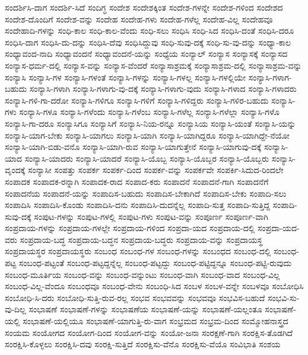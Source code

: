 {ಸಂದರ್ಶಿಸಿ-ದಾಗ
ಸಂದರ್ಶಿ-ಸಿದೆ
ಸಂದಿಗ್ಧ
ಸಂದೇಶ
ಸಂದೇಶಕ್ಕಿಂತ
ಸಂದೇಶ-ಗಳನ್ನೇ
ಸಂದೇಶ-ಗಳಿಂದ
ಸಂದೇಶದ
ಸಂದೇಶ-ದೊಂದಿಗೆ
ಸಂದೇಶ-ವನ್ನು
ಸಂದೇಹ
ಸಂದೇಹ-ಗಳು
ಸಂದೇಹ-ಗಳೆಲ್ಲ
ಸಂದೇಹ-ವಿಲ್ಲ
ಸಂದೇಹವೂ
ಸಂದೇಹಾದಿ-ಗಳನ್ನು
ಸಂಧಿ-ಕಾಲ
ಸಂಧಿ-ಕಾಲ-ವೆಂದು
ಸಂಧಿ-ಸಲು
ಸಂಧಿಸಿ
ಸಂಧಿ-ಸಿದ
ಸಂಧಿಸಿ-ದಂತೆ
ಸಂಧಿಸಿ-ದರೂ
ಸಂಧಿಸಿ-ದಾಗ
ಸಂಧಿಸಿ-ದು-ದನ್ನು
ಸಂಧಿಸಿ-ದೆವು
ಸಂಧಿಸಿದ್ದುವು
ಸಂಧಿ-ಸುವು-ದಕ್ಕೆ
ಸಂಧಿ-ಸು-ವು-ದನ್ನು
ಸಂಧ್ಯಾ-ಕಾಲ
ಸಂಧ್ಯಾವಂದ-ನಾದಿ
ಸಂಧ್ಯಾವಂದನೆ
ಸಂಧ್ಯಾವಂದನೆ-ಯನ್ನು
ಸಂಧ್ಯೆಯ
ಸಂನ್ಯಾಲ್
ಸಂನ್ಯಾಸ
ಸಂನ್ಯಾಸಕ್ಕೆ
ಸಂನ್ಯಾಸದ
ಸಂನ್ಯಾಸ-ಧರ್ಮ-ದಲ್ಲಿ
ಸಂನ್ಯಾಸ-ವನ್ನು
ಸಂನ್ಯಾಸ-ವೆಂದರೆ
ಸಂನ್ಯಾಸಾಶ್ರಮಕ್ಕೆ
ಸಂನ್ಯಾಸಾಶ್ರಮ-ದಲ್ಲಿ
ಸಂನ್ಯಾಸಾಶ್ರಮ-ವನ್ನು
ಸಂನ್ಯಾಸಿ
ಸಂನ್ಯಾಸಿ-ಗಳ
ಸಂನ್ಯಾಸಿ-ಗಳಂತೆ
ಸಂನ್ಯಾಸಿ-ಗಳನ್ನು
ಸಂನ್ಯಾಸಿ-ಗಳಲ್ಲ
ಸಂನ್ಯಾಸಿ-ಗಳಲ್ಲಿಯೇ
ಸಂನ್ಯಾಸಿ-ಗಳಾಗ-ಬಹುದು
ಸಂನ್ಯಾಸಿ-ಗಳಾಗಿ
ಸಂನ್ಯಾಸಿ-ಗಳಾಗು-ವು-ದಕ್ಕೆ
ಸಂನ್ಯಾಸಿ-ಗಳಾಗು-ವುದು
ಸಂನ್ಯಾಸಿ-ಗಳಾದ
ಸಂನ್ಯಾಸಿ-ಗಳಾದರು
ಸಂನ್ಯಾಸಿ-ಗಳಿ-ಗಾ-ದರೋ
ಸಂನ್ಯಾಸಿ-ಗಳಿಗೂ
ಸಂನ್ಯಾಸಿ-ಗಳಿಗೆ
ಸಂನ್ಯಾಸಿ-ಗಳಿದ್ದರು
ಸಂನ್ಯಾಸಿ-ಗಳಿರ-ಬಹುದು
ಸಂನ್ಯಾಸಿ-ಗಳು
ಸಂನ್ಯಾಸಿ-ಗಳೂ
ಸಂನ್ಯಾಸಿ-ಗಳೆಂದು
ಸಂನ್ಯಾಸಿ-ಗಳೆಂಬ
ಸಂನ್ಯಾಸಿ-ಗಳೆಲ್ಲ
ಸಂನ್ಯಾಸಿ-ಗಳೆಲ್ಲಾ
ಸಂನ್ಯಾಸಿ-ಗಳೊ
ಸಂನ್ಯಾಸಿ-ಗಾ-ದರೂ
ಸಂನ್ಯಾಸಿಗೂ
ಸಂನ್ಯಾಸಿಗೆ
ಸಂನ್ಯಾಸಿ-ನಿಯ-ರನ್ನೂ
ಸಂನ್ಯಾಸಿಯ
ಸಂನ್ಯಾಸಿ-ಯಂತೆ
ಸಂನ್ಯಾಸಿ-ಯನ್ನು
ಸಂನ್ಯಾಸಿ-ಯಾಗ-ಬೇಕು
ಸಂನ್ಯಾಸಿ-ಯಾಗಲು
ಸಂನ್ಯಾಸಿ-ಯಾಗಿ
ಸಂನ್ಯಾಸಿ-ಯಾಗಿದ್ದರೂ
ಸಂನ್ಯಾಸಿ-ಯಾಗಿದ್ದೇ-ನೆಯೋ
ಸಂನ್ಯಾಸಿ-ಯಾಗಿ-ಬಿಡು-ವನೊ
ಸಂನ್ಯಾಸಿ-ಯಾಗಿ-ರುವ
ಸಂನ್ಯಾಸಿ-ಯಾಗುತ್ತೇನೆ
ಸಂನ್ಯಾಸಿ-ಯಾಗುವು-ದಕ್ಕೆ
ಸಂನ್ಯಾಸಿ-ಯಾದ
ಸಂನ್ಯಾಸಿ-ಯಾದರು
ಸಂನ್ಯಾಸಿ-ಯಾದರೆ
ಸಂನ್ಯಾಸಿ-ಯೊಬ್ಬ
ಸಂನ್ಯಾಸಿ-ಯೊಬ್ಬರ
ಸಂನ್ಯಾಸಿ-ಯೊಬ್ಬರು
ಸಂನ್ಯಾಸಿ-ವೃಂದಕ್ಕೆ
ಸಂನ್ಯಾಸೀ
ಸಂಪತ್ತು
ಸಂಪರ್ಕ
ಸಂಪರ್ಕ-ದಿಂದ
ಸಂಪರ್ಕ-ವನ್ನು
ಸಂಪರ್ಕವೇ
ಸಂಪರ್ಕಿ-ಸಿದುದ-ರಿಂದಲೇ
ಸಂಪಾದಕ
ಸಂಪಾದಕ-ರನ್ನಾಗಿ
ಸಂಪಾದಕ-ರಾದ
ಸಂಪಾದ-ಕರು
ಸಂಪಾದನೆ
ಸಂಪಾದನೆ-ಗಾಗಿ
ಸಂಪಾದನೆಗೆ
ಸಂಪಾದನೆಯ
ಸಂಪಾದನೆ-ಯನ್ನು
ಸಂಪಾದಿಸ-ಬಹುದು
ಸಂಪಾದಿಸ-ಬೇಕಾಗಿದೆ
ಸಂಪಾದಿಸ-ಬೇಕು
ಸಂಪಾದಿ-ಸಲು
ಸಂಪಾದಿಸಿ
ಸಂಪಾದಿಸಿ-ಕೊಂಡು
ಸಂಪಾದಿಸಿ-ದನು
ಸಂಪಾದಿಸಿ-ದುದನ್ನೆಲ್ಲ
ಸಂಪಾದಿ-ಸುತ್ತ
ಸಂಪಾದಿ-ಸುತ್ತಿದ್ದ
ಸಂಪಾದಿ-ಸುವು-ದಕ್ಕೆ
ಸಂಪುಟ-ಗಳನ್ನು
ಸಂಪುಟ-ಗಳಲ್ಲಿ
ಸಂಪುಟ-ಗಳು
ಸಂಪುಟ-ವನ್ನು
ಸಂಪೂರ್ಣ
ಸಂಪೂರ್ಣ-ವಾಗಿ
ಸಂಪ್ರದಾಯ-ಗಳನ್ನು
ಸಂಪ್ರದಾಯ-ಗಳಲ್ಲೇ
ಸಂಪ್ರದಾಯ-ಗಳಿಂದ
ಸಂಪ್ರದಾ-ಯದ
ಸಂಪ್ರದಾಯ-ದಲ್ಲಿ
ಸಂಪ್ರದಾ-ಯದ-ವರು
ಸಂಪ್ರದಾಯ-ಬದ್ಧ
ಸಂಪ್ರದಾಯ-ಬದ್ಧನ
ಸಂಪ್ರದಾಯ-ಬದ್ಧರು
ಸಂಪ್ರದಾಯ-ವನ್ನು
ಸಂಪ್ರದಾಯಸ್ಥ
ಸಂಪ್ರದಾಯಸ್ಥರ
ಸಂಪ್ರದಾಯಸ್ಥರು
ಸಂಬಂಧ
ಸಂಬಂಧ-ಗಳ
ಸಂಬಂಧ-ಗಳನ್ನು
ಸಂಬಂಧದ
ಸಂಬಂಧ-ದಲ್ಲಿ
ಸಂಬಂಧ-ಪಟ್ಟ
ಸಂಬಂಧ-ಪಟ್ಟಂತೆ
ಸಂಬಂಧ-ಪಟ್ಟದ್ದನ್ನೆಲ್ಲ
ಸಂಬಂಧ-ಪಟ್ಟದ್ದು
ಸಂಬಂಧ-ಪಟ್ಟಿದ್ದನ್ನೂ
ಸಂಬಂಧ-ಪಟ್ಟಿ-ರುವುದು
ಸಂಬಂಧ-ಮೂರ್ತಿಯ
ಸಂಬಂಧ-ವನ್ನು
ಸಂಬಂಧ-ವನ್ನುಂಟು
ಸಂಬಂಧ-ವಾಗಿ
ಸಂಬಂಧ-ವಾದ
ಸಂಬಂಧ-ವಿಲ್ಲ
ಸಂಬಂಧ-ವಿಲ್ಲ-ವೆಂದೂ
ಸಂಬಂಧವೂ
ಸಂಬಂಧ-ವೇನು
ಸಂಬಂಧಿ-ಸಿದ
ಸಂಬಳ
ಸಂಬಳ-ವನ್ನೇ
ಸಂಬಳವೂ
ಸಂಬೋಧಿಸಿ
ಸಂಬೋಧಿ-ಸಿ-ದರು
ಸಂಬೋಧಿ-ಸುತ್ತಿ-ರುವ-ರಲ್ಲ
ಸಂಭವ
ಸಂಭವವನ್ನು
ಸಂಭವವೂ
ಸಂಭವಿಸ-ಬಹುದೆ
ಸಂಭವಿ-ಸು-ವು-ದಿಲ್ಲ
ಸಂಭಾಷಣೆ
ಸಂಭಾಷಣೆ-ಗಳನ್ನು
ಸಂಭಾಷಣೆಯ
ಸಂಭಾಷಣೆ-ಯನ್ನು
ಸಂಭಾಷಣೆ-ಯಲ್ಲಂತೂ
ಸಂಭಾಷಣೆ-ಯಲ್ಲಿ
ಸಂಭಾಷಣೆ-ಯಲ್ಲಿಯೂ
ಸಂಭಾಷಣೆ-ಯಾಗುತ್ತಿ-ರು-ವಾಗ
ಸಂಭ್ರಮದ
ಸಂಭ್ರಮ-ದಿಂದ
ಸಂಮ್ಮೋಹನಾಸ್ತ್ರದ
ಸಂಯಮ
ಸಂಯೋಗದ
ಸಂಯೋಗ-ದಿಂದ
ಸಂಯೋಗ-ವನ್ನು
ಸಂಯೋ-ಜನಾ
ಸಂರಕ್ಷಣೆ-ಗಾಗಿ
ಸಂರಕ್ಷಿಸ-ತೊಡಗಿದೆ
ಸಂರಕ್ಷಿಸಿ-ಕೊಳ್ಳಲು
ಸಂರಕ್ಷಿಸಿ-ದವು
ಸಂರಕ್ಷಿ-ಸುತ್ತಿದೆ
ಸಂರಕ್ಷಿಸು-ವೆನೊ
ಸಂರಕ್ಷಿಸು-ವೆಯೊ
ಸಂವಿಭಾತಿ
ಸಂಶಯ
}
